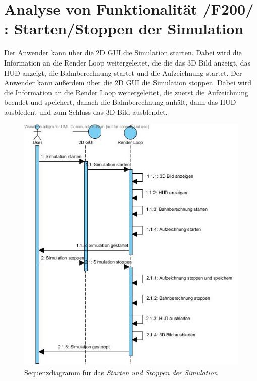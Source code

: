 \section{Analyse von Funktionalität /F200/ :  Starten/Stoppen der Simulation}
Der Anwender kann über die 2D GUI die Simulation starten. Dabei wird die Information an die Render Loop weitergeleitet, die die das 3D Bild anzeigt, das HUD anzeigt, die Bahnberechnung startet und die Aufzeichnung startet. 
Der Anwender kann außerdem über die 2D GUI die Simulation stoppen. Dabei wird die Information an die Render Loop weitergeleitet, die zuerst die Aufzeichnung beendet und speichert, danach die Bahnberechnung anhält, dann das HUD ausbledent und zum Schluss das 3D Bild ausblendet.
\begin{figure}
\includegraphics[width=16cm]{bilder/Simulator_Starten_Stoppen}
\caption{Sequenzdiagramm für das \textit{Starten und Stoppen der Simulation}}
\label{labelname}
\end{figure}

